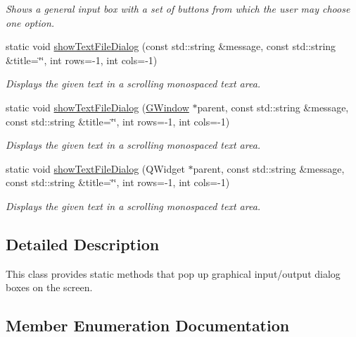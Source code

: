 \begin{DoxyCompactItemize}
\begin{DoxyCompactList}\small\item\em Shows a general input box with a set of buttons from which the user may choose one option. \end{DoxyCompactList}\item 
static void \mbox{\hyperlink{classGOptionPane_ac23d3f6bc00fb83d71f7168bfe162abf}{show\+Text\+File\+Dialog}} (const std\+::string \&message, const std\+::string \&title=\char`\"{}\char`\"{}, int rows=-\/1, int cols=-\/1)
\begin{DoxyCompactList}\small\item\em Displays the given text in a scrolling monospaced text area. \end{DoxyCompactList}\item 
static void \mbox{\hyperlink{classGOptionPane_a7e1e9057ebd16b8769a93dba306a9f55}{show\+Text\+File\+Dialog}} (\mbox{\hyperlink{classGWindow}{G\+Window}} $\ast$parent, const std\+::string \&message, const std\+::string \&title=\char`\"{}\char`\"{}, int rows=-\/1, int cols=-\/1)
\begin{DoxyCompactList}\small\item\em Displays the given text in a scrolling monospaced text area. \end{DoxyCompactList}\item 
static void \mbox{\hyperlink{classGOptionPane_a684cc543d7d7cb206355b534e261d0c9}{show\+Text\+File\+Dialog}} (Q\+Widget $\ast$parent, const std\+::string \&message, const std\+::string \&title=\char`\"{}\char`\"{}, int rows=-\/1, int cols=-\/1)
\begin{DoxyCompactList}\small\item\em Displays the given text in a scrolling monospaced text area. \end{DoxyCompactList}\end{DoxyCompactItemize}


\subsection{Detailed Description}
This class provides static methods that pop up graphical input/output dialog boxes on the screen. 

\subsection{Member Enumeration Documentation}
\mbox{\label{classGOptionPane_a1cc9e8685029e39646671ed71f32d47d}} 
